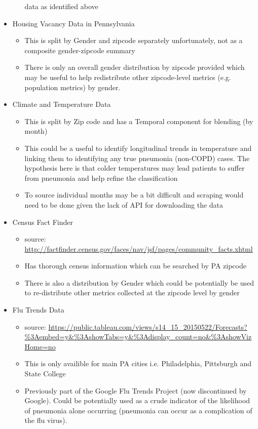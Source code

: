 \documentclass{article}
\begin{document}
\begin{itemize}
\begin{itemize}
          data as identified above
  \end{itemize}
  \item Housing Vacancy Data in Pennsylvania
  \begin{itemize}
    \item This is split by Gender and zipcode separately unfortunately, not as
          a composite gender-zipcode summary
    \item There is only an overall gender distribution by zipcode provided 
          which may be useful to help redistribute other zipcode-level metrics 
          (e.g. population metrics) by gender. 
  \end{itemize}
  \item Climate and Temperature Data
  \begin{itemize}
    \item This is split by Zip code and has a Temporal component for blending (by month)
    \item This could be a useful to identify longitudinal trends in temperature
          and linking them to identifying any true pneumonia (non-COPD) cases. The 
          hypothesis here is that colder temperatures may lead patients to 
          suffer from pneumonia and help refine the classification
    \item To source individual months may be a bit difficult and scraping 
          would need to be done given the lack of API for downloading the data
  \end{itemize}
  \item Census Fact Finder
  \begin{itemize}
    \item source: \url{http://factfinder.census.gov/faces/nav/jsf/pages/community_facts.xhtml}
    \item Has thorough census information which can be searched by PA zipcode
    \item There is also a distribution by Gender which could be potentially be 
          used to re-distribute other metrics collected at the zipcode level by 
          gender
  \end{itemize}
  \item Flu Trends Data
  \begin{itemize}
    \item source: \url{https://public.tableau.com/views/s14_15_20150522/Forecasts?%3Aembed=y&%3AshowTabs=y&%3Adisplay_count=no&%3AshowVizHome=no}
    \item This is only availible for main PA cities i.e. Philadelphia, 
          Pittsburgh and State College
    \item Previously part of the Google Flu Trends Project (now discontinued by 
          Google). Could be potentially used as a crude indicator of the 
          likelihood of pneumonia alone occurring (pneumonia can occur as 
          a complication of the flu virus).
  \end{itemize}
\end{itemize}



\end{document}
